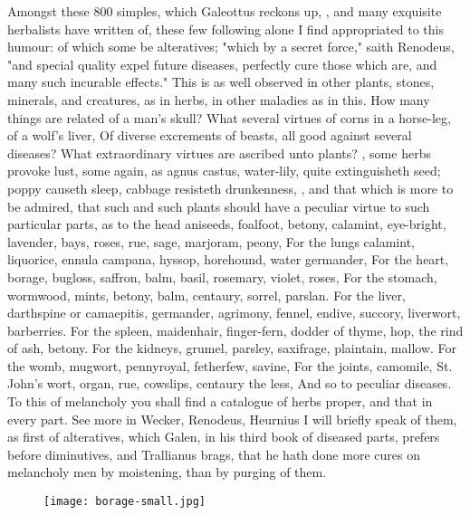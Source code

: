 {Amongst these 800 simples, which Galeottus reckons up, , and many exquisite herbalists have written of, these few following alone I find appropriated to this humour: of which some be alteratives; "which by a secret force," saith Renodeus, "and special quality expel future diseases, perfectly cure those which are, and many such incurable effects." This is as well observed in other plants, stones, minerals, and creatures, as in herbs, in other maladies as in this. How many things are related of a man's skull? What several virtues of corns in a horse-leg, of a wolf's liver, \etc{} Of diverse excrements of beasts, all good against several diseases? What extraordinary virtues are ascribed unto plants? , some herbs provoke lust, some again, as agnus castus, water-lily, quite extinguisheth seed; poppy causeth sleep, cabbage resisteth drunkenness, \etc{}, and that which is more to be admired, that such and such plants should have a peculiar virtue to such particular parts, as to the head aniseeds, foalfoot, betony, calamint, eye-bright, lavender, bays, roses, rue, sage, marjoram, peony, \etc{} For the lungs calamint, liquorice, ennula campana, hyssop, horehound, water germander, \etc{} For the heart, borage, bugloss, saffron, balm, basil, rosemary, violet, roses, \etc{} For the stomach, wormwood, mints, betony, balm, centaury, sorrel, parslan. For the liver, darthspine or camaepitis, germander, agrimony, fennel, endive, succory, liverwort, barberries. For the spleen, maidenhair, finger-fern, dodder of thyme, hop, the rind of ash, betony. For the kidneys, grumel, parsley, saxifrage, plaintain, mallow. For the womb, mugwort, pennyroyal, fetherfew, savine, \etc{} For the joints, camomile, St. John's wort, organ, rue, cowslips, centaury the less, \etc{} And so to peculiar diseases. To this of melancholy you shall find a catalogue of herbs proper, and that in every part. See more in Wecker, Renodeus, Heurnius  \etc{} I will briefly speak of them, as first of alteratives, which Galen, in his third book of diseased parts, prefers before diminutives, and Trallianus brags, that he hath done more cures on melancholy men by moistening, than by purging of them.

\begin{figure}[p]
  \begingroup
  \centering
  \texttt{[image: borage-small.jpg]}
  \label{fig:borage}
\end{figure}

}
